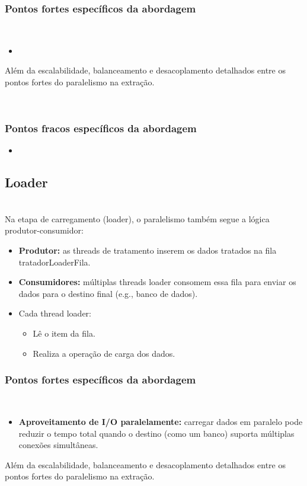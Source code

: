\documentclass[a4paper,12pt]{article}
\begin{document}
\subsubsection*{Pontos fortes específicos da abordagem}
\\

\begin{itemize}
    \item \textbf{} 
    
\end{itemize}
Além da escalabilidade, balanceamento e desacoplamento detalhados entre os pontos fortes do paralelismo na extração.

\vspace{1em}

\\
\subsubsection*{Pontos fracos específicos da abordagem}

\begin{itemize}
    \item \textbf{} 

\end{itemize}


\subsection*{Loader}
\\
Na etapa de carregamento (loader), o paralelismo também segue a lógica produtor-consumidor:

\begin{itemize}
    \item \textbf{Produtor:} as threads de tratamento inserem os dados tratados na fila tratadorLoaderFila.

    \item \textbf{Consumidores:} múltiplas threads loader consomem essa fila para enviar os dados para o destino final (e.g., banco de dados).

    \item Cada thread loader:
    \begin{itemize}
        \item Lê o item da fila.
        \item Realiza a operação de carga dos dados.
    \end{itemize}
\end{itemize}


\subsubsection*{Pontos fortes específicos da abordagem}
\\
\begin{itemize}
    \item \textbf{Aproveitamento de I/O paralelamente:} carregar dados em paralelo pode reduzir o tempo total quando o destino (como um banco) suporta múltiplas conexões simultâneas.
    
\end{itemize}
Além da escalabilidade, balanceamento e desacoplamento detalhados entre os pontos fortes do paralelismo na extração.
\end{document}
